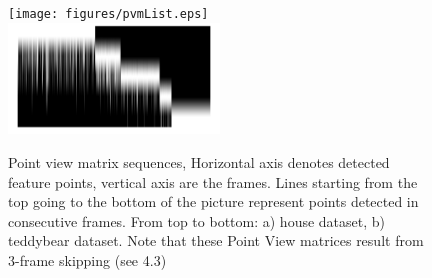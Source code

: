 \begin{figure}[ht!]
  \centering
    \texttt{[image: figures/pvmList.eps]}\\
    \includegraphics[width=0.50\textwidth]{figures/teddypvm.png}
    \caption{Point view matrix sequences, Horizontal axis denotes detected feature points, vertical axis are the frames. Lines starting from the top going to the bottom of the picture represent points detected in consecutive frames. From top to bottom: a) house dataset, b) teddybear dataset. Note that these Point View matrices result from 3-frame skipping (see 4.3)}
    \label{fig:pointMatching}
\end{figure}

